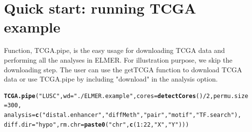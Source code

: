 \documentclass{article}\usepackage[]{graphicx}\usepackage[usenames,dvipsnames]{color}
\makeatletter
\newcommand{\hlnum}[1]{\textcolor[rgb]{0.686,0.059,0.569}{#1}}%
\newcommand{\hlstr}[1]{\textcolor[rgb]{0.192,0.494,0.8}{#1}}%
\newcommand{\hlopt}[1]{\textcolor[rgb]{0,0,0}{#1}}%
\newcommand{\hlstd}[1]{\textcolor[rgb]{0.345,0.345,0.345}{#1}}%
\newcommand{\hlkwc}[1]{\textcolor[rgb]{0.333,0.667,0.333}{#1}}%
\newcommand{\hlkwd}[1]{\textcolor[rgb]{0.737,0.353,0.396}{\textbf{#1}}}%
\newenvironment{kframe}{%
 \def\at@end@of@kframe{}%
 \ifinner\ifhmode%
  \def\at@end@of@kframe{\end{minipage}}%
  \begin{minipage}{\columnwidth}%
 \fi\fi%
 \def\FrameCommand##1{\hskip\@totalleftmargin \hskip-\fboxsep
 \colorbox{shadecolor}{##1}\hskip-\fboxsep
     \hskip-\linewidth \hskip-\@totalleftmargin \hskip\columnwidth}%
 \MakeFramed {\advance\hsize-\width
   \@totalleftmargin\z@ \linewidth\hsize
   \@setminipage}}%
 {\par\unskip\endMakeFramed%
 \at@end@of@kframe}
\newenvironment{knitrout}{}{} %
\makeatother
\begin{document}
\section{Quick start: running TCGA example}
Function, TCGA.pipe, is the easy usage for downloading TCGA data and performing all 
the analyses in ELMER. For illustration purpose, we skip the downloading step. 
The user can use the getTCGA function to download TCGA data or
use TCGA.pipe by including "download" in the analysis option.

\begin{knitrout}
\color{fgcolor}\begin{kframe}
\begin{alltt}
\hlkwd{TCGA.pipe}\hlstd{(}\hlstr{"LUSC"}\hlstd{,}\hlkwc{wd}\hlstd{=}\hlstr{"./ELMER.example"}\hlstd{,}\hlkwc{cores}\hlstd{=}\hlkwd{detectCores}\hlstd{()}\hlopt{/}\hlnum{2}\hlstd{,}\hlkwc{permu.size}\hlstd{=}\hlnum{300}\hlstd{,}
          \hlkwc{analysis} \hlstd{=} \hlkwd{c}\hlstd{(}\hlstr{"distal.enhancer"}\hlstd{,}\hlstr{"diffMeth"}\hlstd{,}\hlstr{"pair"}\hlstd{,}\hlstr{"motif"}\hlstd{,}\hlstr{"TF.search"}\hlstd{),}
          \hlkwc{diff.dir}\hlstd{=}\hlstr{"hypo"}\hlstd{,}\hlkwc{rm.chr}\hlstd{=}\hlkwd{paste0}\hlstd{(}\hlstr{"chr"}\hlstd{,}\hlkwd{c}\hlstd{(}\hlnum{1}\hlopt{:}\hlnum{22}\hlstd{,}\hlstr{"X"}\hlstd{,}\hlstr{"Y"}\hlstd{)))}
\end{alltt}


{\ttfamily\noindent\itshape\color{messagecolor}{\#\# \#\#\#\#\#\#\#\#\#\#\#\#\#\#\#\#\#\#\#\\\#\# Select distal enhancer probes\\\#\# \#\#\#\#\#\#\#\#\#\#\#\#\#\#\#\#\#\#\#}}

{\ttfamily\noindent\color{warningcolor}{\#\# Warning in (function (probe, distal = TRUE, feature, TSS, TSS.range = list(upstream = 2000, : Default probes coordinates are for HM450K DNA methylation array}}


\end{kframe}
\end{knitrout}
\end{document}
